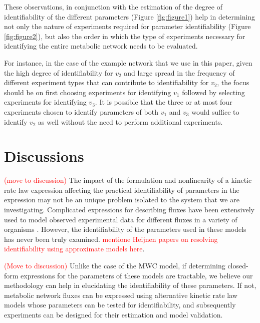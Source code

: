 \documentclass[10pt]{article}
\begin{document}
	These observations, in conjunction with the estimation of the degree of identifiability of the different parameters (Figure \ref{fig:figure1}) help in determining not only the nature of experiments required for parameter identifiability (Figure \ref{fig:figure2}), but also the order in which the type of experiments necessary for identifying the entire metabolic network needs to be evaluated.
	
	For instance, in the case of the example network that we use in this paper, given the high degree of identifiability for $v_2$ and large spread in the frequency of different experiment types that can contribute to identifiability for $v_2$, the focus should be on first choosing experiments for identifying $v_1$ followed by selecting experiments for identifying $v_3$. It is possible that the three or at most four experiments chosen to identify parameters of both $v_1$ and $v_3$ would suffice to identify $v_2$ as well without the need to perform additional experiments.	
	
	\section{Discussions}\label{sec:discussion}	
	\textcolor{red}{(move to discussion)} The impact of the formulation and nonlinearity of a kinetic rate law expression affecting the practical identifiability of parameters in the expression may not be an unique problem isolated to the system that we are investigating. Complicated expressions for describing fluxes have been extensively used to model observed experimental data for different fluxes in a variety of organisms \parencite{Chassagnole2002a, Peskov2012, VanHeerden2014}. However, the identifiability of the parameters used in these models has never been truly examined. \textcolor{red}{mentione Heijnen papers on resolving identifiability using approximate models here}.
	
	\textcolor{red}{(Move to discussion)} Unlike the case of the MWC model, if determining closed-form expressions for the parameters of these models are tractable, we believe our methodology can help in elucidating the identifiability of these parameters. If not, metabolic network fluxes can be expressed using alternative kinetic rate law models whose parameters can be tested for identifiability, and subsequently experiments can be designed for their estimation and model validation.
	
\end{document}
